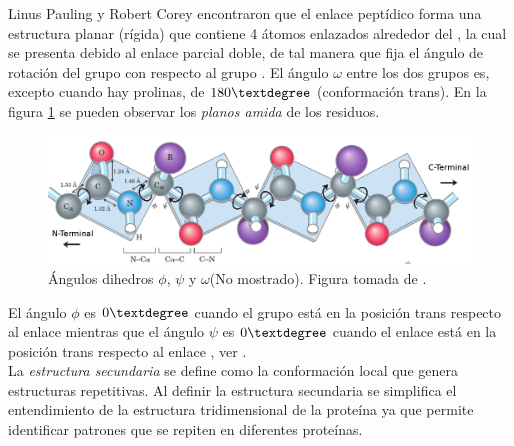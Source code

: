 Linus Pauling y Robert Corey encontraron que el enlace pept\'{i}dico forma una estructura planar (r\'{i}gida) que contiene 4 \'{a}tomos enlazados alrededor del , la cual se presenta debido al enlace parcial doble, de tal manera que fija el \'{a}ngulo de rotaci\'{o}n del grupo  con respecto al grupo . El \'{a}ngulo $\omega$ entre los dos grupos es, excepto cuando hay prolinas, de $180\textdegree$ (conformaci\'{o}n trans). En la figura \ref{fig:pepti2} se pueden observar los \textit{planos amida} de los residuos.\\ 
\begin{figure}[H]
\centering
\includegraphics[scale=0.3]{Kap3/peptide.png}
\caption{\'{A}ngulos dihedros $\phi$, $\psi$ y $\omega$(No mostrado). Figura tomada de \cite{Nelson2011}.}\label{fig:pepti2}
\end{figure}
El \'{a}ngulo $\phi$ es $0\textdegree$ cuando el grupo  est\'{a} en la posici\'{o}n trans respecto al enlace  mientras que el \'{a}ngulo $\psi$ es  $0\textdegree$ cuando el enlace  est\'{a} en la posici\'{o}n trans respecto al enlace , ver \cite{Kuchel}.\\

La \textit{estructura secundaria} se define como la conformaci\'{o}n local que genera estructuras repetitivas. Al definir la estructura secundaria se simplifica el entendimiento de la estructura tridimensional de la prote\'{i}na ya que permite identificar patrones que se repiten en diferentes prote\'{i}nas.\\

